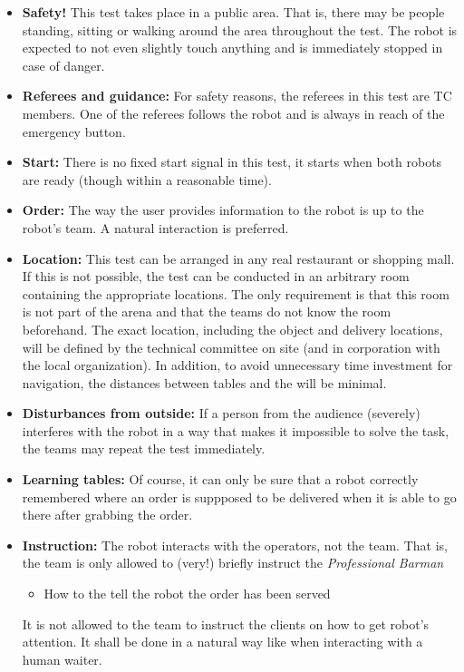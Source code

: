 \begin{itemize}
	\item \textbf{Safety!} This test takes place in a public area. That is, there may be people standing, sitting or walking around the area throughout the test. The robot is expected to not even slightly touch anything and is immediately stopped in case of danger.

	\item \textbf{Referees and guidance:} For safety reasons, the referees in this test are TC members. One of the referees follows the robot and is always in reach of the emergency button.

	\item \textbf{Start:} There is no fixed start signal in this test, it starts when both robots are ready (though within a reasonable time).

	\item \textbf{Order:} The way the user provides information to the robot is up to the robot's team. A natural interaction is preferred.

	\item \textbf{Location:} This test can be arranged in any real restaurant or shopping mall. If this is not possible, the test can be conducted in an arbitrary room containing the appropriate locations. 
	  The only requirement is that this room is not part of the arena and that the teams do not know the room beforehand. 
	  The exact location, including the object and delivery locations, will be defined by the technical committee on site (and in corporation with the local organization). 
	  In addition, to avoid unnecessary time investment for navigation, the distances between tables and the  will be minimal.

	\item \textbf{Disturbances from outside:} If a person from the audience (severely) interferes with the robot in a way that makes it impossible to solve the task, the teams may repeat the test immediately.

	\item \textbf{Learning tables:} Of course, it can only be sure that a robot correctly remembered where an order is suppposed to be delivered when it is able to go there after grabbing the order. 
	
	\item \textbf{Instruction:} The robot interacts with the operators, not the team. That is, the team is only allowed to (very!) briefly instruct the \textit{Professional Barman} 
	\begin{itemize} 
		\item How to the tell the robot the order has been served
	\end{itemize}
	It is not allowed to the team to instruct the clients on how to get robot's attention. It shall be done in a natural way like when interacting with a human waiter.


\end{itemize}
